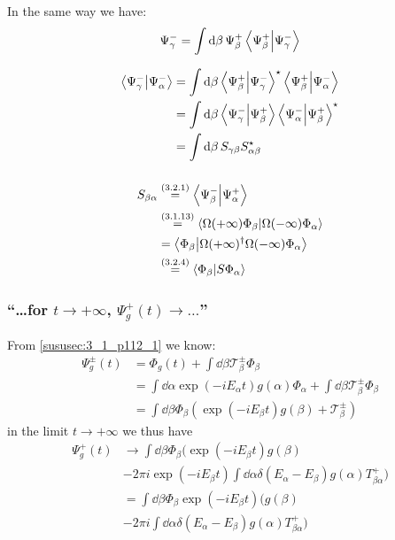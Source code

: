 In the same way we have:
\[\Psi_\gamma^-=\int\dd{\beta}\Psi_\beta^+\braket{\Psi_\beta^+}{\Psi_\gamma^-}\]

\begin{align*}
	\braket{\Psi_\gamma^-}{\Psi_\alpha^-}&=
	\int\dd{\beta}\braket{\Psi_\beta^+}{\Psi_\gamma^-}^\star \braket{\Psi_\beta^+}{\Psi_\alpha^-}\\
	&=\int\dd{\beta}\braket{\Psi_\gamma^-}{\Psi_\beta^+} \braket{\Psi_\alpha^-}{\Psi_\beta^+}^\star\\
	&=\int\dd{\beta} S_{\gamma\beta} S_{\alpha\beta}^\star
\end{align*}


\subsubsection{ }
\begin{align*}
	S_{\beta\alpha}&\overset{({3.2.1})}{=}\braket{\Psi_\beta^-}{\Psi_\alpha^+}\\
	&\overset{({3.1.13})}{=}\braket{\Omega(+\infty)\Phi_\beta}{\Omega(-\infty)\Phi_\alpha}\\
	&=\braket{\Phi_\beta}{\Omega(+\infty)^\dagger\Omega(-\infty)\Phi_\alpha}\\
	&\overset{({3.2.4})}{=}\braket{\Phi_\beta}{S\Phi_\alpha}
\end{align*}


\subsubsection{\enquote{\dots for $t\rightarrow+\infty$, $\Psi^+_g(t)\rightarrow\dots$} }

From \ref{sususec:3_1_p112_1} we know:
\begin{align*}
	\Psi^\pm_g(t)&=\Phi_g(t)+\int \dd{\beta} \mathcal{T}^\pm_\beta \Phi_\beta\\
	&=\int \dd{\alpha} \exp(-iE_\alpha t) g(\alpha) \Phi_\alpha
	+\int \dd{\beta} \mathcal{T}^\pm_\beta \Phi_\beta\\
	&=\int \dd{\beta} \Phi_\beta \left(\exp(-iE_\beta t) g(\beta)+\mathcal{T}^\pm_\beta\right)
\end{align*}
in the limit $t\rightarrow+\infty$ we thus have
\begin{align*}
	\Psi^+_g(t)&\rightarrow \int \dd{\beta} \Phi_\beta (\exp(-iE_\beta t) g(\beta)\\
	&-2 \pi i \exp(-iE_\beta t)\int\dd{\alpha} \delta (E_\alpha-E_\beta) g(\alpha)T_{\beta\alpha}^+)\\
	&=\int \dd{\beta} \Phi_\beta\exp(-iE_\beta t) ( g(\beta)\\
	&-2 \pi i \int\dd{\alpha} \delta (E_\alpha-E_\beta) g(\alpha)T_{\beta\alpha}^+)
\end{align*}



